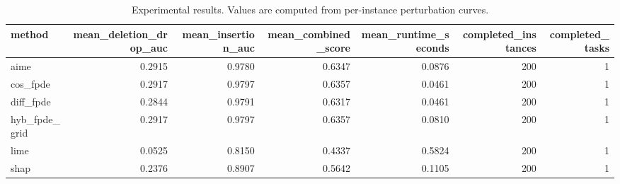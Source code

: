 \begin{table}[t]
\caption{Experimental results. Values are computed from per-instance perturbation curves.}
\label{tab:main_results_computed}
\centering
\begin{tabular}{lrrrrrr}
\toprule
method & mean\_deletion\_drop\_auc & mean\_insertion\_auc & mean\_combined\_score & mean\_runtime\_seconds & completed\_instances & completed\_tasks \\
\midrule
aime & 0.2915 & 0.9780 & 0.6347 & 0.0876 & 200 & 1 \\
cos\_fpde & 0.2917 & 0.9797 & 0.6357 & 0.0461 & 200 & 1 \\
diff\_fpde & 0.2844 & 0.9791 & 0.6317 & 0.0461 & 200 & 1 \\
hyb\_fpde\_grid & 0.2917 & 0.9797 & 0.6357 & 0.0810 & 200 & 1 \\
lime & 0.0525 & 0.8150 & 0.4337 & 0.5824 & 200 & 1 \\
shap & 0.2376 & 0.8907 & 0.5642 & 0.1105 & 200 & 1 \\
\bottomrule
\end{tabular}

\end{table}
